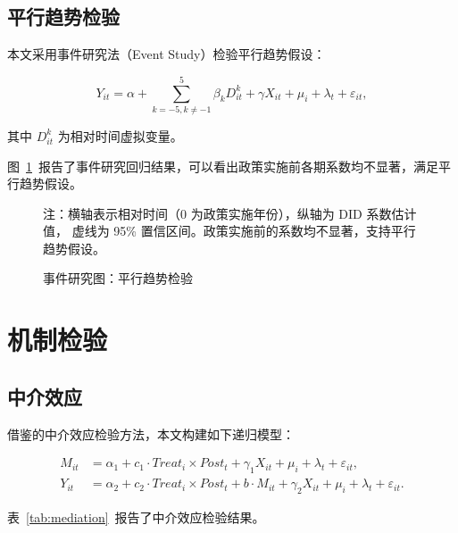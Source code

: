 \documentclass[lang=cn, aaffiliation={中国}]{ctexart}
\begin{document}
\subsection{平行趋势检验}
\label{sec:parallel}

本文采用事件研究法（Event Study）检验平行趋势假设：

\begin{equation}
    \label{eq:event}
    Y_{it} = \alpha + \sum_{k=-5, k\neq-1}^{5} \beta_k D_{it}^k + \gamma X_{it} + \mu_i + \lambda_t + \varepsilon_{it},
\end{equation}

其中 $D_{it}^k$ 为相对时间虚拟变量。

图~\ref{fig:event_study}~报告了事件研究回归结果，可以看出政策实施前各期系数均不显著，满足平行趋势假设。

\begin{figure}[htbp]
    \centering
    \caption{事件研究图：平行趋势检验}
    \label{fig:event_study}
    \begin{minipage}{0.85\textwidth}\footnotesize
        注：横轴表示相对时间（0 为政策实施年份），纵轴为 DID 系数估计值，
        虚线为 95\% 置信区间。政策实施前的系数均不显著，支持平行趋势假设。
    \end{minipage}
\end{figure}

\section{机制检验}
\label{sec:mechanism}

\subsection{中介效应}
\label{sec:mediation}

借鉴\citet{xxx}的中介效应检验方法，本文构建如下递归模型：

\begin{align}
    \label{eq:mediation}
    M_{it} &= \alpha_1 + c_1 \cdot Treat_i \times Post_t + \gamma_1 X_{it} + \mu_i + \lambda_t + \varepsilon_{it}, \\
    Y_{it} &= \alpha_2 + c_2 \cdot Treat_i \times Post_t + b \cdot M_{it} + \gamma_2 X_{it} + \mu_i + \lambda_t + \varepsilon_{it}.
\end{align}

表~\ref{tab:mediation}~报告了中介效应检验结果。
\end{document}
